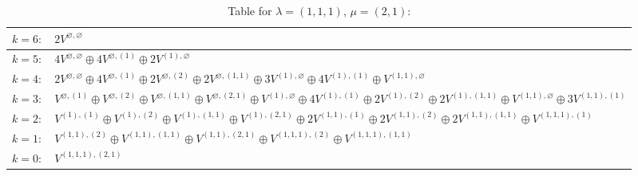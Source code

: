 \documentclass[a4paper,12pt]{article}
\begin{document}
\renewcommand{\arraystretch}{1.6} 
\begin{table}[H]
\centering
\caption{Table for $\lambda = (1, 1, 1)$, $\mu = (2, 1)$:}
\begin{tabular}{|>{\centering\arraybackslash}p{15cm}|}
\hline
 $k = 6: \quad 2 V^{\varnothing, \varnothing} $ \\ \hline
 $k = 5: \quad 4 V^{\varnothing, \varnothing} \oplus 4 V^{\varnothing, (1)} \oplus 2 V^{(1), \varnothing} $ \\ \hline
 $k = 4: \quad 2 V^{\varnothing, \varnothing} \oplus 4 V^{\varnothing, (1)} \oplus 2 V^{\varnothing, (2)} \oplus 2 V^{\varnothing, (1, 1)} \oplus 3 V^{(1), \varnothing} \oplus 4 V^{(1), (1)} \oplus V^{(1, 1), \varnothing} $ \\ \hline
 $k = 3: \quad V^{\varnothing, (1)} \oplus V^{\varnothing, (2)} \oplus V^{\varnothing, (1, 1)} \oplus V^{\varnothing, (2, 1)} \oplus V^{(1), \varnothing} \oplus 4 V^{(1), (1)} \oplus 2 V^{(1), (2)} \oplus 2 V^{(1), (1, 1)} \oplus V^{(1, 1), \varnothing} \oplus 3 V^{(1, 1), (1)} $ \\ \hline
 $k = 2: \quad V^{(1), (1)} \oplus V^{(1), (2)} \oplus V^{(1), (1, 1)} \oplus V^{(1), (2, 1)} \oplus 2 V^{(1, 1), (1)} \oplus 2 V^{(1, 1), (2)} \oplus 2 V^{(1, 1), (1, 1)} \oplus V^{(1, 1, 1), (1)} $ \\ \hline
 $k = 1: \quad V^{(1, 1), (2)} \oplus V^{(1, 1), (1, 1)} \oplus V^{(1, 1), (2, 1)} \oplus V^{(1, 1, 1), (2)} \oplus V^{(1, 1, 1), (1, 1)} $ \\ \hline
 $k = 0: \quad V^{(1, 1, 1), (2, 1)} $ \\ \hline
\end{tabular}
\end{table}
\end{document}
